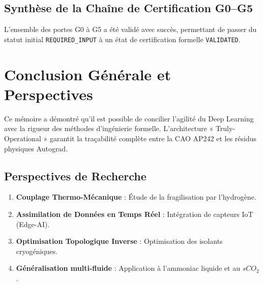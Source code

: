 \documentclass[12pt,a4paper,oneside]{report}
\begin{document}
\section{Synthèse de la Chaîne de Certification G0–G5}
L'ensemble des portes G0 à G5 a été validé avec succès, permettant de passer du statut initial \texttt{REQUIRED\_INPUT} à un état de certification formelle \texttt{VALIDATED}.

\chapter*{Conclusion Générale et Perspectives}
Ce mémoire a démontré qu'il est possible de concilier l'agilité du Deep Learning avec la rigueur des méthodes d'ingénierie formelle. L'architecture « Truly-Operational » garantit la traçabilité complète entre la CAO AP242 et les résidus physiques Autograd.

\section*{Perspectives de Recherche}
\begin{enumerate}
    \item \textbf{Couplage Thermo-Mécanique} : Étude de la fragilisation par l'hydrogène.
    \item \textbf{Assimilation de Données en Temps Réel} : Intégration de capteurs IoT (Edge-AI).
    \item \textbf{Optimisation Topologique Inverse} : Optimisation des isolants cryogéniques.
    \item \textbf{Généralisation multi-fluide} : Application à l'ammoniac liquide et au $sCO_2$.
\end{enumerate}
\end{document}
